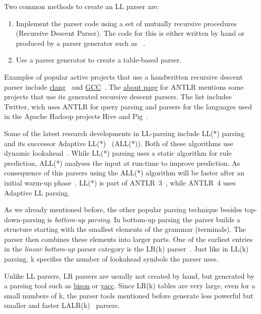 Two common methods to create an LL parser are:

\begin{enumerate}

  \item Implement the parser code using a set of mutually recursive procedures (Recursive Descent Parser). The code for this is either written by hand or produced by a parser generator such as ~\cite{parr2013recursive}.

  \item Use a parser generator to create a table-based parser.

\end{enumerate}

Examples of popular active projects that use a handwritten recursive descent parser include \href{http://clang.llvm.org}{clang}~\cite{bendersky2012clang} and \href{http://gcc.gnu.org}{GCC}~\cite{myers2008cparser}. The \href{http://www.antlr.org/about.html}{about page} for \gls{ANTLR} mentions some projects that use its generated recursive descent parsers. The list includes Twitter, wich uses ANTLR for query parsing and parsers for the languages used in the Apache Hadoop projects Hive and Pig~\cite{parr2013definitive}.

Some of the latest research developments in LL-parsing include LL(*) parsing~\cite{parr2011ll} and its successor Adaptive LL(*)~\cite{parr2014adaptive} (ALL(*)). Both of these algorithms use dynamic lookahead~\cite[p. 1]{parr2011ll}. While LL(*) parsing uses a static algorithm for rule prediction, ALL(*) analyses the input at run-time to improve prediction. As consequence of this parsers using the ALL(*) algorithm will be faster after an initial warm-up phase~\cite[p. 3]{parr2014adaptive}. LL(*) is part of \gls{ANTLR}~3~\cite[p. 3]{parr2014adaptive}, while \gls{ANTLR}~4 uses Adaptive LL parsing.

As we already mentioned before, the other popular parsing technique besides top-down-parsing is \emph{bottom-up parsing}. In bottom-up parsing the parser builds a structure starting with the smallest elements of the grammar (terminals). The parser then combines these elements into larger parts. One of the earliest entries in the \emph{linear bottom-up} parser category is the LR(k) parser~\cite{knuth1965translation}. Just like in LL(k) parsing, k specifies the number of lookahead symbols the parser uses.

\begin{sloppypar}
Unlike LL parsers, LR parsers are usually not created by hand, but generated by a parsing tool such as \href{https://www.gnu.org/software/bison}{bison} or \href{http://dinosaur.compilertools.net/yacc}{yacc}. Since LR(k) tables are very large, even for a small numbers of k, the parser tools mentioned before generate less powerful but smaller and faster LALR(k)~\cite{deremer1969practical} parsers.
\end{sloppypar}

